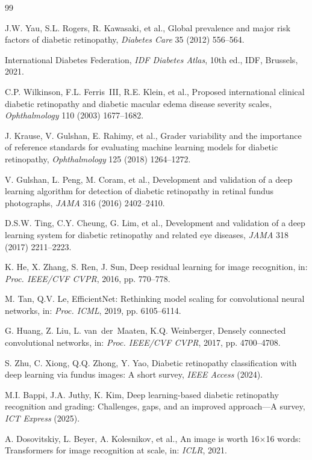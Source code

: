 \documentclass[a4paper,fleqn]{cas-dc}
\begin{document}
\begin{thebibliography}{99}

J.W. Yau, S.L. Rogers, R. Kawasaki, et al.,
Global prevalence and major risk factors of diabetic retinopathy,
\textit{Diabetes Care} 35 (2012) 556--564.

International Diabetes Federation,
\textit{IDF Diabetes Atlas}, 10th ed.,
IDF, Brussels, 2021.

C.P. Wilkinson, F.L. Ferris~III, R.E. Klein, et al.,
Proposed international clinical diabetic retinopathy and diabetic macular edema disease severity scales,
\textit{Ophthalmology} 110 (2003) 1677--1682.

J. Krause, V. Gulshan, E. Rahimy, et al.,
Grader variability and the importance of reference standards for evaluating machine learning models for diabetic retinopathy,
\textit{Ophthalmology} 125 (2018) 1264--1272.

V. Gulshan, L. Peng, M. Coram, et al.,
Development and validation of a deep learning algorithm for detection of diabetic retinopathy in retinal fundus photographs,
\textit{JAMA} 316 (2016) 2402--2410.

D.S.W. Ting, C.Y. Cheung, G. Lim, et al.,
Development and validation of a deep learning system for diabetic retinopathy and related eye diseases,
\textit{JAMA} 318 (2017) 2211--2223.

K. He, X. Zhang, S. Ren, J. Sun,
Deep residual learning for image recognition,
in: \textit{Proc. IEEE/CVF CVPR}, 2016, pp. 770--778.

M. Tan, Q.V. Le,
EfficientNet: Rethinking model scaling for convolutional neural networks,
in: \textit{Proc. ICML}, 2019, pp. 6105--6114.

G. Huang, Z. Liu, L. van~der~Maaten, K.Q. Weinberger,
Densely connected convolutional networks,
in: \textit{Proc. IEEE/CVF CVPR}, 2017, pp. 4700--4708.

S. Zhu, C. Xiong, Q.Q. Zhong, Y. Yao,
Diabetic retinopathy classification with deep learning via fundus images: A short survey,
\textit{IEEE Access} (2024).

M.I. Bappi, J.A. Juthy, K. Kim,
Deep learning-based diabetic retinopathy recognition and grading: Challenges, gaps, and an improved approach---A survey,
\textit{ICT Express} (2025).

A. Dosovitskiy, L. Beyer, A. Kolesnikov, et al.,
An image is worth 16$\times$16 words: Transformers for image recognition at scale,
in: \textit{ICLR}, 2021.


\end{thebibliography}
\end{document}
